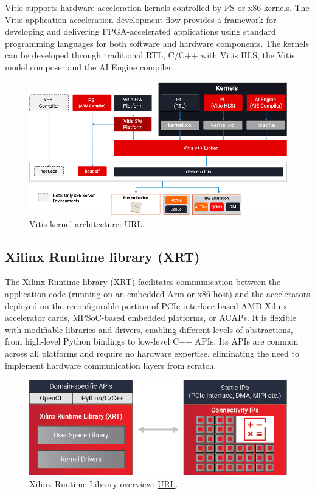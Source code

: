 Vitis supports hardware acceleration kernels controlled by PS or x86 kernels. The Vitis application acceleration development flow provides a framework for developing and delivering FPGA-accelerated applications using standard programming languages for both software and hardware components. The kernels can be developed through traditional RTL, C/C++ with Vitis HLS, the Vitis model composer and the AI Engine compiler.
\begin{figure}[H]
    \centering
        \includegraphics[width=1\textwidth]{Images/Platform/vitis_kernel.png}
        \decoRule
        \caption[Vitis]{Vitis kernel architecture: \href{https://www.xilinx.com/products/design-tools/vitis/vitis-platform.html\#development}{URL}.}
        \label{fig:Vitis_kernel_overview}
\end{figure}

\subsection{Xilinx Runtime library (XRT)}
The Xilinx Runtime library\cite{Xilinx_Runtime_Library} (XRT) facilitates communication between the application code (running on an embedded Arm or x86 host) and the accelerators deployed on the reconfigurable portion of PCIe interface-based AMD Xilinx accelerator cards, MPSoC-based embedded platforms, or ACAPs. It is flexible with modifiable libraries and drivers, enabling different levels of abstractions, from high-level Python bindings to low-level C++ APIs. Its APIs are common across all platforms and require no hardware expertise, eliminating the need to implement hardware communication layers from scratch.
\begin{figure}[H]
    \centering
        \includegraphics[width=1\textwidth]{Images/Platform/xrt.png}
        \decoRule
        \caption[Xilinx Runtime Library]{Xilinx Runtime Library overview: \href{https://www.xilinx.com/products/design-tools/vitis/xrt.html}{URL}.}
        \label{fig:XRT_overview}
\end{figure}

